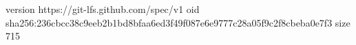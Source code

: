 version https://git-lfs.github.com/spec/v1
oid sha256:236cbcc38c9eeb2b1bd8bfaa6ed3f49f087e6e9777c28a05f9c2f8cbeba0e7f3
size 715
